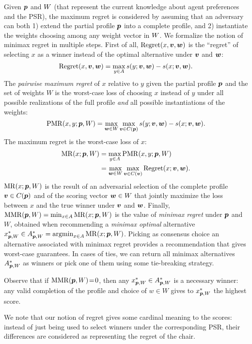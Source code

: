 \documentclass[runningheads]{llncs}
\begin{document}
Given ${\bm{p}}$ and $W$ (that represent the current knowledge about agent preferences and the PSR),
the maximum regret is considered by assuming that an adversary can both 1) extend the partial profile ${\bm{p}}$ into a complete profile, and 2) instantiate the weights choosing among any weight vector in $W$. %
We formalize the notion of minimax regret in multiple steps.
First of all, $\operatorname{Regret}(x, \bm{v}, \bm{w})$
is the “regret” of selecting $x$ as a winner instead of the optimal alternative under $\bm{v}$ and $\bm{w}$:
$$\operatorname{Regret}(x, \bm{v}, \bm{w}) = \max_{y \in A} s(y; \bm{v},\bm{w}) - s(x; \bm{v}, \bm{w}).$$
The {\em pairwise maximum regret} of $x$ relative to $y$ given the partial profile ${\bm{p}}$ and the set of weights $W$ is the worst-case loss of choosing $x$ instead of $y$ under all possible realizations of the full profile {\em and} all possible instantiations of the weights:
$$\operatorname{PMR}(x,y;{\bm{p}},W) = \max_{\bm{w} \in W} \max_{\bm{v} \in C({\bm{p}})} s(y; \bm{v},\bm{w}) - s(x; \bm{v},\bm{w}).$$
The maximum regret %
is the worst-case loss of $x$:
\begin{align}
	\operatorname{MR}(x;{\bm{p}},W) & = \max_{y \in A} \operatorname{PMR}(x,y; {\bm{p}}, W) \\ &= \max_{\bm{w} \in W} \max_{\bm{v} \in C(\bm{v})} \operatorname{Regret}(x; \bm{v}, \bm{w}).
\end{align}
$\operatorname{MR}(x;{\bm{p}},W)$ is the result of an adversarial selection of the complete profile $\bm{v} \in C({\bm{p}})$ and of the scoring vector $\bm{w} \in W$ that jointly maximize the loss between $x$ and the true winner under $\bm{v}$ and $\bm{w}$.
Finally,  $\operatorname{MMR}({\bm{p}},W) = \min_{x \in A} \operatorname{MR}(x;{\bm{p}},W)$ is the value of {\em minimax regret} under ${\bm{p}}$ and $W$, obtained when recommending a {\em minimax optimal} alternative $x^*_{{\bm{p}}, W} \in A^*_{{\bm{p}}, W} = \operatorname*{argmin}_{x \in A} \operatorname{MR}(x;{\bm{p}},W)$.
Picking as consensus choice an alternative associated with minimax regret provides a recommendation that gives worst-case guarantees. 
In cases of ties, %
we can return all minimax alternatives $A^*_{{\bm{p}}, W}$ as winners or pick one of them using some tie-breaking strategy.

Observe that if $\operatorname{MMR}({\bm{p}}, W)\!=\!0$, then any $x^{*}_{{\bm{p}},W} \in A^*_{{\bm{p}}, W}$ is a necessary winner: any valid completion of the profile and choice of $w \in W$ gives to $x^{*}_{{\bm{p}},W}$ the highest score.

We note that our notion of regret gives some cardinal meaning to the scores: instead of just being used to select winners under the corresponding PSR, their differences are considered as representing the regret of the chair.
\end{document}
